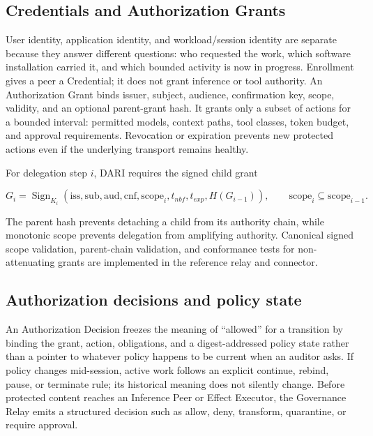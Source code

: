 \documentclass[10pt]{article}
\begin{document}
\subsection{Credentials and Authorization Grants}

User identity, application identity, and workload/session identity are separate because they answer different questions: who requested the work, which software installation carried it, and which bounded activity is now in progress. Enrollment gives a peer a Credential; it does not grant inference or tool authority. An Authorization Grant binds issuer, subject, audience, confirmation key, scope, validity, and an optional parent-grant hash. It grants only a subset of actions for a bounded interval: permitted models, context paths, tool classes, token budget, and approval requirements. Revocation or expiration prevents new protected actions even if the underlying transport remains healthy.

For delegation step $i$, DARI requires the signed child grant

\begin{equation}
G_i = \operatorname{Sign}_{K_i}(\mathrm{iss},\mathrm{sub},\mathrm{aud},\mathrm{cnf},\mathrm{scope}_i,t_{nbf},t_{exp},H(G_{i-1})),
\qquad \mathrm{scope}_i \subseteq \mathrm{scope}_{i-1}.
\label{eq:attenuation}
\end{equation}

The parent hash prevents detaching a child from its authority chain, while monotonic scope prevents delegation from amplifying authority. Canonical signed scope validation, parent-chain validation, and conformance tests for non-attenuating grants are implemented in the reference relay and connector.

\subsection{Authorization decisions and policy state}

An Authorization Decision freezes the meaning of ``allowed'' for a transition by binding the grant, action, obligations, and a digest-addressed policy state rather than a pointer to whatever policy happens to be current when an auditor asks. If policy changes mid-session, active work follows an explicit continue, rebind, pause, or terminate rule; its historical meaning does not silently change. Before protected content reaches an Inference Peer or Effect Executor, the Governance Relay emits a structured decision such as allow, deny, transform, quarantine, or require approval.
\end{document}
